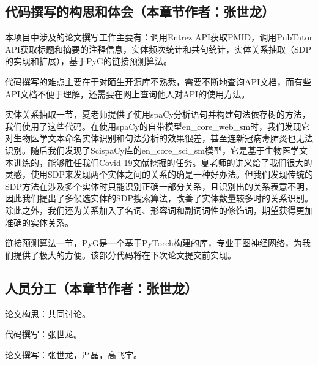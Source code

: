 \documentclass[twocolumn]{article}
\begin{document}
\subsection{代码撰写的构思和体会（本章节作者：张世龙）}
本项目中涉及的论文撰写工作主要有：调用Entrez API获取PMID，调用PubTator API获取标题和摘要的注释信息，实体频次统计和共句统计，实体关系抽取（SDP的实现和扩展），基于PyG的链接预测算法。\par
代码撰写的难点主要在于对陌生开源库不熟悉，需要不断地查询API文档，而有些API文档不便于理解，还需要在网上查询他人对API的使用方法。\par
实体关系抽取一节，夏老师提供了使用spaCy分析语句并构建句法依存树的方法，我们使用了这些代码。在使用spaCy的自带模型en\_core\_web\_sm时，我们发现它对生物医学文本命名实体识别和句法分析的效果很差，甚至连新冠病毒肺炎也无法识别。随后我们发现了ScispaCy库的en\_core\_sci\_sm模型，它是基于生物医学文本训练的，能够胜任我们Covid-19文献挖掘的任务。夏老师的讲义给了我们很大的灵感，使用SDP来发现两个实体之间的关系的确是一种好办法。但我们发现传统的SDP方法在涉及多个实体时只能识别正确一部分关系，且识别出的关系表意不明，因此我们提出了多候选实体的SDP搜索算法，改善了实体数量较多时的关系识别。除此之外，我们还为关系加入了名词、形容词和副词词性的修饰词，期望获得更加准确的实体关系。\par
链接预测算法一节，PyG是一个基于PyTorch构建的库，专业于图神经网络，为我们提供了极大的方便。该部分代码将在下次论文提交前实现。

\subsection{人员分工（本章节作者：张世龙）}
论文构思：共同讨论。\par
代码撰写：张世龙。\par
论文撰写：张世龙，严晶，高飞宇。\par
\end{document}
